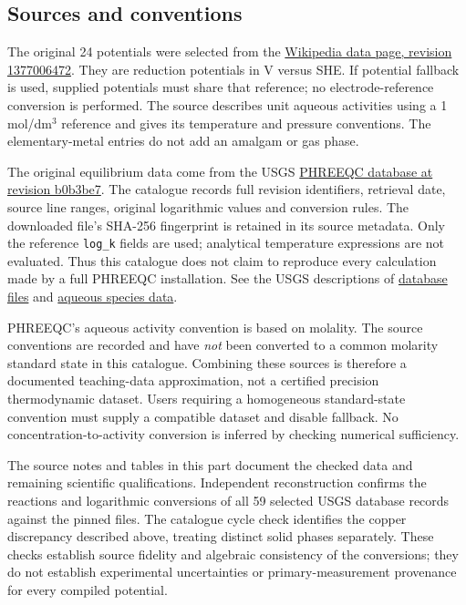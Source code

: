 \documentclass[a4paper,11pt]{ltxdoc}
\begin{document}
\subsection{Sources and conventions}
The original 24 potentials were selected from the
\href{https://en.wikipedia.org/w/index.php?title=Standard_electrode_potential_(data_page)&oldid=1377006472}{Wikipedia data page, revision 1377006472}.
They are reduction potentials in V versus SHE. If potential fallback is used,
supplied potentials must share that reference; no electrode-reference conversion
is performed. The source describes unit aqueous
activities using a 1 mol/dm$^3$ reference and gives its temperature and pressure
conventions. The elementary-metal entries do not add an amalgam or gas phase.

The original equilibrium data come from the USGS
\href{https://github.com/usgs-coupled/phreeqc3/blob/b0b3be767158ccc3322d2c816625cf470045e67e/database/phreeqc.dat}{PHREEQC database at revision b0b3be7}.
The catalogue records full revision identifiers, retrieval date, source line
ranges, original logarithmic values and conversion rules. The downloaded file's
SHA-256 fingerprint is retained in its source metadata. Only the reference
\texttt{log\_k} fields are used; analytical temperature expressions are not
evaluated. Thus this catalogue does not claim to reproduce every calculation
made by a full PHREEQC installation. See the USGS descriptions of
\href{https://water.usgs.gov/water-resources/software/PHREEQC/documentation/phreeqc3-html/phreeqc3-5.htm}{database files}
and \href{https://water.usgs.gov/water-resources/software/PHREEQC/documentation/phreeqc3-html/phreeqc3-50.htm}{aqueous species data}.

PHREEQC's aqueous activity convention is based on molality. The source
conventions are recorded and have \emph{not} been converted to a common
molarity standard state in this catalogue. Combining these sources is
therefore a documented teaching-data approximation, not a certified precision
thermodynamic dataset. Users requiring a homogeneous standard-state convention
must supply a compatible dataset and disable fallback. No concentration-to-activity
conversion is inferred by checking numerical sufficiency.

The source notes and tables in this part document the checked data and
remaining scientific qualifications.
Independent reconstruction confirms the reactions and logarithmic conversions
of all 59 selected USGS database records against the pinned files. The catalogue
cycle check identifies the copper discrepancy described above, treating distinct
solid phases separately. These checks establish source fidelity and algebraic
consistency of the conversions; they do not establish experimental uncertainties
or primary-measurement provenance for every compiled potential.
\end{document}
